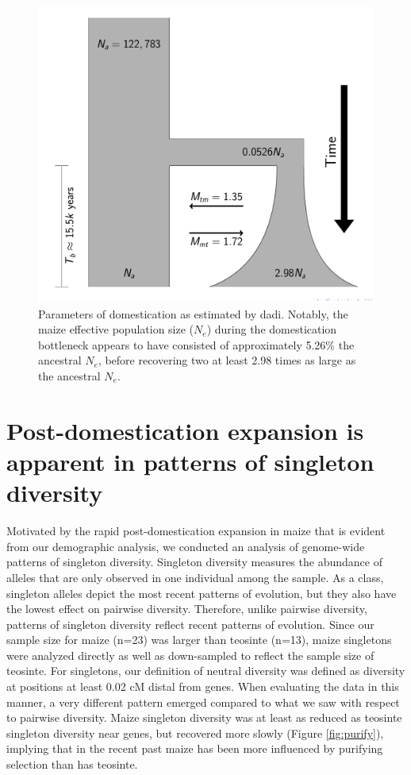 \documentclass{pnastwo}
\begin{document}
\begin{article}
\begin{figure}[!htb]
\centering
\includegraphics[width=.4\textwidth]{FigsAndFiles/DomesticationModel/domesticationModel.pdf}
\caption{Parameters of domestication as estimated by dadi. Notably,
  the maize effective population size ($N_e$) during the domestication
  bottleneck appears to have consisted of approximately 5.26\%
  the ancestral $N_e$, before recovering two at least 2.98
  times as large as the ancestral $N_e$. \label{fig:bottleneck} }
\end{figure}

\section{Post-domestication expansion is apparent in patterns of singleton diversity}
Motivated by the rapid post-domestication expansion in maize that is evident from our demographic analysis, we conducted an analysis of genome-wide patterns of singleton diversity. Singleton diversity measures the abundance of alleles that are only observed in one individual among the sample. As a class, singleton alleles depict the most recent patterns of evolution, but
they also have the lowest effect on pairwise diversity. Therefore, unlike
pairwise diversity, patterns of singleton
diversity reflect recent patterns of evolution. Since our sample size
for maize (n=23) was larger than teosinte (n=13), maize singletons were
analyzed directly as well as down-sampled to reflect the sample size of
teosinte. For singletons, our definition of
neutral diversity was defined as diversity at positions at
least 0.02 cM distal from genes. When
evaluating the data in this manner, a very different pattern
emerged compared to what we saw with respect to pairwise diversity. Maize singleton diversity was at least as reduced as teosinte singleton
diversity near genes, but recovered more slowly
(Figure \ref{fig:purify}), implying that in the
recent past maize has been more influenced by purifying selection than has
teosinte.


\end{article}
\end{document}
